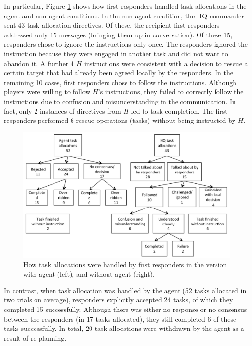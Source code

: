 In particular, Figure \ref{fig:msgs} shows how first responders handled task allocations in the agent and  non-agent conditions. In the non-agent condition, the HQ commander sent 43 task allocation directives. Of these, the recipient first responders addressed only 15 messages (bringing them up in conversation). Of these 15, responders chose to ignore the instructions only once. The responders ignored the instruction because they were engaged in another task and did not want to abandon it. A further 4 $H$ instructions were consistent with a decision to rescue a certain target that had already been agreed locally by the responders. In the remaining 10 cases, first responders chose to follow the instructions. Although players were willing to follow $H$'s instructions, they failed to correctly follow the instructions due to confusion and misunderstanding in the communication. In fact, only 2 instances of directives from $H$ led to task completion. The first responders performed 6 rescue operations (tasks) without being instructed by $H$.

\begin{figure}[t]
\includegraphics[width=\columnwidth]{message_handling.png}
\vspace{-5mm}
\caption{How task allocations were handled by first responders in the version with agent (left), and without agent (right).\vspace{-3mm}}\label{fig:msgs}
\end{figure}

In contrast, when task allocation was handled by the agent (52 tasks allocated in two trials on average), responders explicitly accepted 24 tasks,  of which they completed 15  successfully. Although there was either no response or no consensus between the responders (in 17 tasks allocated), they still completed 6 of these tasks successfully. In total, 20 task allocations were withdrawn by the agent as a result of re-planning. 



